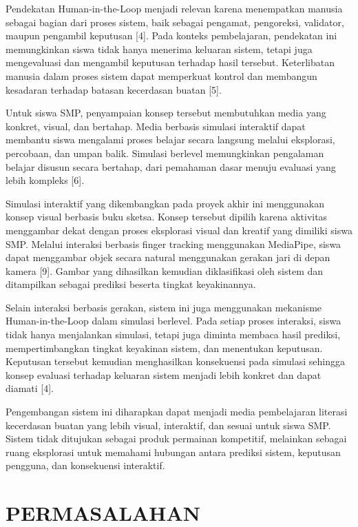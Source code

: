 \documentclass[12pt,oneside]{report}
\begin{document}
Pendekatan Human-in-the-Loop menjadi relevan karena menempatkan manusia sebagai bagian dari proses sistem, baik sebagai pengamat, pengoreksi, validator, maupun pengambil keputusan [4]. Pada konteks pembelajaran, pendekatan ini memungkinkan siswa tidak hanya menerima keluaran sistem, tetapi juga mengevaluasi dan mengambil keputusan terhadap hasil tersebut. Keterlibatan manusia dalam proses sistem dapat memperkuat kontrol dan membangun kesadaran terhadap batasan kecerdasan buatan [5].

Untuk siswa SMP, penyampaian konsep tersebut membutuhkan media yang konkret, visual, dan bertahap. Media berbasis simulasi interaktif dapat membantu siswa mengalami proses belajar secara langsung melalui eksplorasi, percobaan, dan umpan balik. Simulasi berlevel memungkinkan pengalaman belajar disusun secara bertahap, dari pemahaman dasar menuju evaluasi yang lebih kompleks [6].

Simulasi interaktif yang dikembangkan pada proyek akhir ini menggunakan konsep visual berbasis buku sketsa. Konsep tersebut dipilih karena aktivitas menggambar dekat dengan proses eksplorasi visual dan kreatif yang dimiliki siswa SMP. Melalui interaksi berbasis finger tracking menggunakan MediaPipe, siswa dapat menggambar objek secara natural menggunakan gerakan jari di depan kamera [9]. Gambar yang dihasilkan kemudian diklasifikasi oleh sistem dan ditampilkan sebagai prediksi beserta tingkat keyakinannya.

Selain interaksi berbasis gerakan, sistem ini juga menggunakan mekanisme Human-in-the-Loop dalam simulasi berlevel. Pada setiap proses interaksi, siswa tidak hanya menjalankan simulasi, tetapi juga diminta membaca hasil prediksi, mempertimbangkan tingkat keyakinan sistem, dan menentukan keputusan. Keputusan tersebut kemudian menghasilkan konsekuensi pada simulasi sehingga konsep evaluasi terhadap keluaran sistem menjadi lebih konkret dan dapat diamati [4].

Pengembangan sistem ini diharapkan dapat menjadi media pembelajaran literasi kecerdasan buatan yang lebih visual, interaktif, dan sesuai untuk siswa SMP. Sistem tidak ditujukan sebagai produk permainan kompetitif, melainkan sebagai ruang eksplorasi untuk memahami hubungan antara prediksi sistem, keputusan pengguna, dan konsekuensi interaktif.

\section{PERMASALAHAN}
\label{sec:permasalahan}
\end{document}
